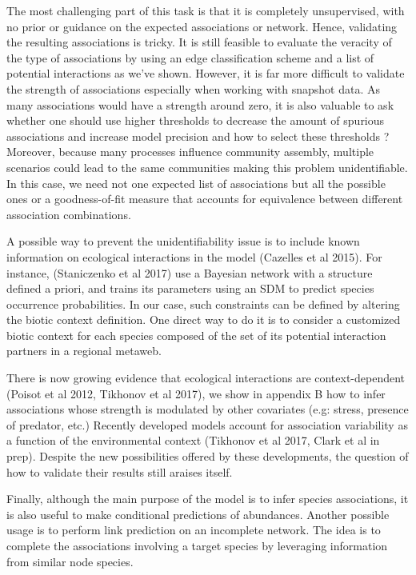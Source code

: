 \documentclass[10pt,a4paper]{article}
\begin{document}
The most challenging part of this task is that it is completely unsupervised, with no prior or guidance on the expected associations or network. Hence, validating the resulting associations is tricky. It is still feasible to evaluate the veracity of the type of associations by using an edge classification scheme and a list of potential interactions as we've shown. However, it is far more difficult to validate the strength of associations especially when working with snapshot data. As many associations would have a strength around zero, it is also valuable to ask whether one should use higher thresholds to decrease the amount of spurious associations and increase model precision and how to select these thresholds ? Moreover, because many processes influence community assembly, multiple scenarios could lead to the same communities making this problem unidentifiable. In this case, we need not one expected list of associations but all the possible ones or a goodness-of-fit measure that accounts for equivalence between different association combinations. 

A possible way to prevent the unidentifiability issue is to include known information on ecological interactions in the model (Cazelles et al 2015). For instance, (Staniczenko et al 2017) use a Bayesian network with a structure defined a priori, and trains its parameters using an SDM to predict species occurrence probabilities. In our case, such constraints can be defined by altering the biotic context definition. One direct way to do it is to consider a customized biotic context for each species composed of the set of its potential interaction partners in a regional metaweb. 

There is now growing evidence that ecological interactions are context-dependent (Poisot et al 2012, Tikhonov et al 2017), we show in appendix B how to infer associations whose strength is modulated by other covariates (e.g: stress, presence of predator, etc.) Recently developed models account for association variability as a function of the environmental context (Tikhonov et al 2017, Clark et al in prep). Despite the new possibilities offered by these developments, the question of how to validate their results still araises itself.

Finally, although the main purpose of the model is to infer species associations, it is also useful to make conditional predictions of abundances. Another possible usage is to perform link prediction on an incomplete network. The idea is to complete the associations involving a target species by leveraging information from similar node species.
\end{document}
